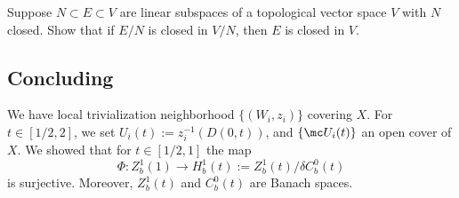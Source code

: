 \documentclass[11pt]{report}
\begin{document}
\begin{exercise}[Easy][label=exer:quotient-to-closed]
Suppose $N \subset E \subset V$ are linear subspaces of a topological vector space $V$ with $N$ closed. Show that if $E/N$ is closed in $V/N$, then $E$ is closed in $V$.
\end{exercise}

\subsection{\texorpdfstring{Concluding }{Concluding Second Finiteness Theorem}}

We have local trivialization neighborhood $\{(W_i,z_i)\}$ covering $X$. For $t \in [1/2,2]$, we set $U_i(t):= z_i^{-1}(D(0,t))$, and $\{\mc U_i(t)\}$ an open cover of $X$. We showed that for $t \in [1/2,1]$ the map
\[
\Phi:Z_b^1(1) \to H^1_b(t):= Z^1_b(t)/\delta C_b^0(t)
\]
is surjective. Moreover, $Z_b^1(t)$ and $C_b^0(t)$ are Banach spaces.
\end{document}
